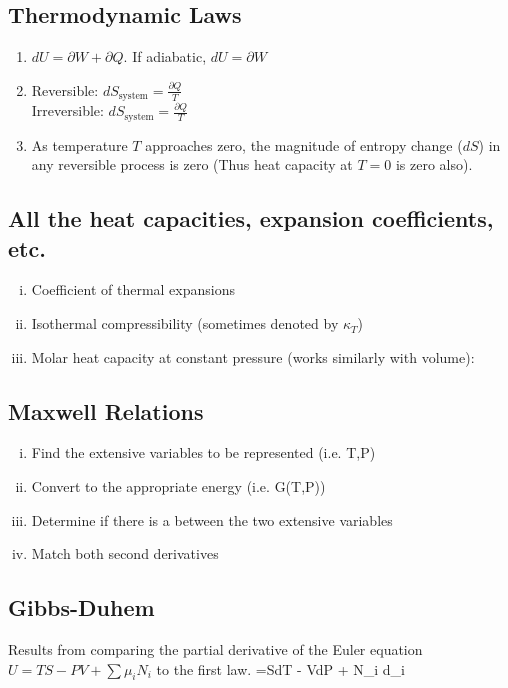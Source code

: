 \documentclass[12pt]{article}
\begin{document}
\subsection{Thermodynamic Laws}
\begin{enumerate}[(1)]
\item $dU = \partial W + \partial Q$.  If adiabatic, $dU = \partial W$
\item Reversible: $dS_\text{system} = \frac{\partial Q}{T}$\\
Irreversible: $dS_\text{system} = \frac{\partial Q}{T}$
\item As temperature $T$ approaches zero, the magnitude of entropy change ($dS$) in any reversible process is zero (Thus heat capacity at $T=0$ is zero also).
\end{enumerate}



\subsection{All the heat capacities, expansion coefficients, etc.}
\begin{enumerate}[(i)]
\item Coefficient of thermal expansions
\eqs
{}
\eqe
\item Isothermal compressibility (sometimes denoted by $\kappa_T$)
\eqs
{}
\eqe
\item Molar heat capacity at constant pressure (works similarly with volume):
\eqs
{}
\eqe
\end{enumerate}
\subsection{Maxwell Relations}
\begin{enumerate}[(i)]
\item Find the extensive variables to be represented (i.e. T,P)
\item Convert to the appropriate energy (i.e. G(T,P))
\item Determine if there is a  between the two extensive variables
\item Match both second derivatives
\end{enumerate}
\subsection{Gibbs-Duhem}
Results from comparing the partial derivative of the Euler equation $U = TS - PV + \sum\mu_i N_i$ to the first law.
=SdT - VdP + \sum N_i d\mu_i
\eqe
\end{document}
